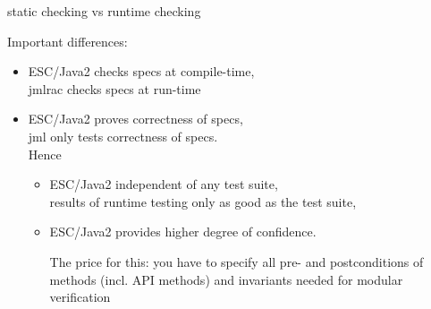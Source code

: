 \documentclass[
pdf,
nocolorBG,
slideColor,
erik,
]{prosper}
\begin{document}
\begin{slide}{static checking vs runtime checking}
\vspace*{-4ex}

Important differences:

\begin{itemize}
\item ESC/Java2 checks specs at {\blue compile-time}, \\
      jmlrac checks specs at {\green run-time}

\item ESC/Java2 {\blue proves} correctness of specs,\\
      jml only {\green tests} correctness of specs.
\\
Hence
\begin{itemize}
\item ESC/Java2 independent of any test suite, \\
      results of runtime testing only as good as the test suite,
\item ESC/Java2 provides higher degree of confidence.

\medskip
The price for this: you have to specify all pre- and postconditions
of methods (incl. API methods)
and invariants needed for {\blue modular verification}
\end{itemize}


\end{itemize}

\end{slide}


\end{document}
